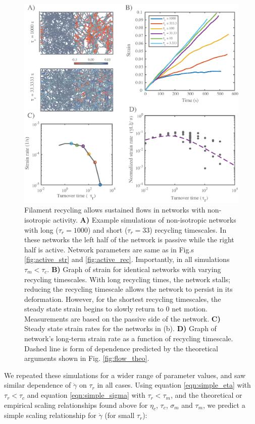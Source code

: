 \begin{figure}[h!]
	\centering
	\includegraphics[width=\hsize]{active/figures/Fig9}
	\caption{\label{fig:flow_ex}  Filament recycling allows sustained flows in networks with non-isotropic activity. \textbf{A)} Example simulations of non-isotropic networks with long ($\tau_r=1000$) and short ($\tau_r=33$) recycling timescales. In these networks the left half of the network is passive while the right half is active.  Network parameters are same as in Fig.s \ref{fig:active_str} and \ref{fig:active_rec}. Importantly, in all simulations $\tau_{m}<\tau_c$. \textbf{B)} Graph of strain for identical networks with varying recycling timescales.  With long recycling times, the network stalls; reducing the recycling timescale allows the network to persist in its deformation.  However, for the shortest recycling timescales, the steady state strain begins to slowly return to 0 net motion.  Measurements are based on the passive side of the network. \textbf{C)} Steady state strain rates for the networks in (b).     \textbf{D)} Graph of network's long-term strain rate as a function of recycling timescale. Dashed line is form of dependence predicted by the  theoretical arguments shown in Fig. \ref{fig:flow_theo}.}
\end{figure}

We repeated these simulations for a wider range of parameter values, and saw similar dependence of $\dot{\gamma}$ on $\tau_r$ in all cases.  Using equation \ref{eqn:simple_eta} with $\tau_r < \tau_c$ and equation \ref{eqn:simple_sigma} with $\tau_r < \tau_m$, and the theoretical or empirical scaling relationships found above for $\eta_c$, $\tau_c$, $\sigma_m$ and $\tau_m$, we predict a simple scaling relationship for $\dot{\gamma}$ (for small $\tau_r$):


